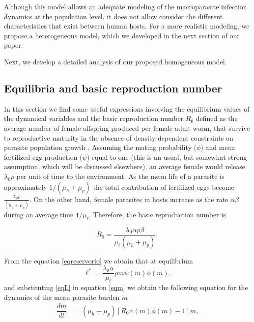 \documentclass[eng]{MMSB-class-eng}
\begin{document}
{Although this model allows an adequate modeling of the macroparasite infection dynamics at the population level, it does not allow consider the different characteristics that exist between human hosts.
For a more realistic modeling, we propose a heterogeneous model, which we developed in the next section of our paper.

Next, we develop a detailed analysis of our proposed homogeneous model.


\subsection{Equilibria and basic reproduction number}

{\color{red}
In this section we find some useful expressions involving the equilibrium values of the dynamical variables and the basic reproduction number $R_0$ defined as 
the average number of female offspring produced per female adult worm, that survive to reproductive maturity in the
absence of density-dependent constraints on parasite population growth \citep{anderson1992infectious}. Assuming the mating probability ($\phi$) and mean fertilized egg production ($\psi$) equal to one (this is an usual, but somewhat strong assumption, which will be discussed elsewhere), an average female would release $ \lambda_0  \rho$ per unit of time to the environment. As the mean life of a parasite is approximately $1/(\mu_h+\mu_p)$ the total contribution of fertilized eggs become $\frac{\lambda_0  \rho}{ (\mu_h + \mu_p)}$. On the other hand, female parasites in hosts increase as the rate $\alpha\beta$ during an average time $1/\mu_{\ell}$. Therefore, the basic reproduction number is 

\color{red}
\begin{equation}\label{valorR0}
R_0=\frac{ \lambda_0 \alpha  \rho \beta }{\mu_{\ell} (\mu_h + \mu_p) },
\end{equation}
}

From the equation \eqref{eqreservorio} we obtain that at equilibrium
\begin{equation}\label{eqL}
\ell^*=\frac{ \lambda_0 \alpha}{\mu_{\ell}} \rho  m \psi(m)\phi(m), 
\end{equation} 
and substituting \eqref{eqL} in equation \eqref{eqm} we obtain the following equation for the dynamics of the mean parasite burden $m$
\begin{align}\label{eqMR0}
\dfrac{dm}{dt}&=(\mu_h + \mu_p)\left[ R_0  \psi(m)\phi(m) -1 \right] m,%
\end{align}


}
\end{document}
